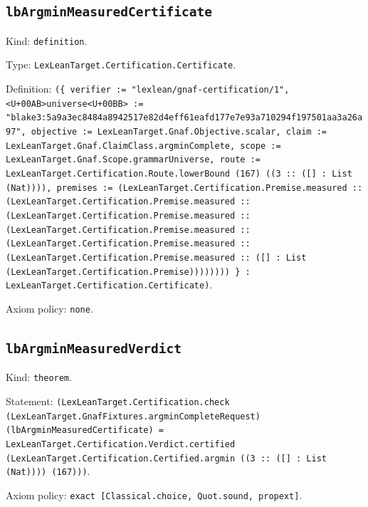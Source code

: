 \documentclass[11pt]{article}
\begin{document}
\subsection*{\texttt{lbArgminMeasuredCertificate}}
\noindent Kind: \texttt{definition}.\par
\noindent Type: \texttt{LexLeanTarget.Certification.Certificate}.\par
\noindent Definition: \texttt{(\{ verifier := "lexlean/gnaf-certification/1", <U+00AB>universe<U+00BB> := "blake3:5a9a3ec8484a8942517e82d4eff61eafd177e7e93a710294f197501aa3a26a97", objective := LexLeanTarget.Gnaf.Objective.scalar, claim := LexLeanTarget.Gnaf.ClaimClass.argminComplete, scope := LexLeanTarget.Gnaf.Scope.grammarUniverse, route := LexLeanTarget.Certification.Route.lowerBound (167) ((3 :: ([] : List (Nat)))), premises := (LexLeanTarget.Certification.Premise.measured :: (LexLeanTarget.Certification.Premise.measured :: (LexLeanTarget.Certification.Premise.measured :: (LexLeanTarget.Certification.Premise.measured :: (LexLeanTarget.Certification.Premise.measured :: (LexLeanTarget.Certification.Premise.measured :: ([] : List (LexLeanTarget.Certification.Premise)))))))) \} : LexLeanTarget.Certification.Certificate)}.\par
\noindent Axiom policy: \texttt{none}.\par
\subsection*{\texttt{lbArgminMeasuredVerdict}}
\noindent Kind: \texttt{theorem}.\par
\noindent Statement: \texttt{(LexLeanTarget.Certification.check (LexLeanTarget.GnafFixtures.argminCompleteRequest) (lbArgminMeasuredCertificate) = LexLeanTarget.Certification.Verdict.certified (LexLeanTarget.Certification.Certified.argmin ((3 :: ([] : List (Nat)))) (167)))}.\par
\noindent Axiom policy: \texttt{exact [Classical.choice, Quot.sound, propext]}.\par
\end{document}
